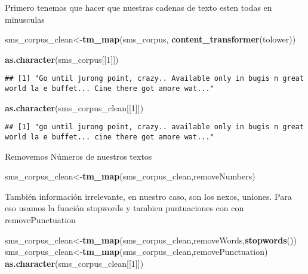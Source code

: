 \documentclass[]{article}
\newenvironment{Shaded}{\begin{snugshade}}{\end{snugshade}}
\newcommand{\KeywordTok}[1]{\textcolor[rgb]{0.13,0.29,0.53}{\textbf{#1}}}
\newcommand{\DecValTok}[1]{\textcolor[rgb]{0.00,0.00,0.81}{#1}}
\newcommand{\NormalTok}[1]{#1}
\begin{document}
Primero tenemos que hacer que nuestras cadenas de texto esten todas en
minusculas

\begin{Shaded}
\begin{Highlighting}[]
\NormalTok{sms_corpus_clean<-}\KeywordTok{tm_map}\NormalTok{(sms_corpus, }\KeywordTok{content_transformer}\NormalTok{(tolower))}

\KeywordTok{as.character}\NormalTok{(sms_corpus[[}\DecValTok{1}\NormalTok{]])}
\end{Highlighting}
\end{Shaded}

\begin{verbatim}
## [1] "Go until jurong point, crazy.. Available only in bugis n great world la e buffet... Cine there got amore wat..."
\end{verbatim}

\begin{Shaded}
\begin{Highlighting}[]
\KeywordTok{as.character}\NormalTok{(sms_corpus_clean[[}\DecValTok{1}\NormalTok{]])}
\end{Highlighting}
\end{Shaded}

\begin{verbatim}
## [1] "go until jurong point, crazy.. available only in bugis n great world la e buffet... cine there got amore wat..."
\end{verbatim}

Removemos Números de nuestros textos

\begin{Shaded}
\begin{Highlighting}[]
\NormalTok{sms_corpus_clean<-}\KeywordTok{tm_map}\NormalTok{(sms_corpus_clean,removeNumbers)}
\end{Highlighting}
\end{Shaded}

También información irrelevante, en nuestro caso, son los nexos,
uniones. Para eso usamos la función stopwords y tambien puntuaciones con
con removePunctuation

\begin{Shaded}
\begin{Highlighting}[]
\NormalTok{sms_corpus_clean<-}\KeywordTok{tm_map}\NormalTok{(sms_corpus_clean,removeWords,}\KeywordTok{stopwords}\NormalTok{())}
\NormalTok{sms_corpus_clean<-}\KeywordTok{tm_map}\NormalTok{(sms_corpus_clean,removePunctuation)}
\KeywordTok{as.character}\NormalTok{(sms_corpus_clean[[}\DecValTok{1}\NormalTok{]])}
\end{Highlighting}
\end{Shaded}
\end{document}
